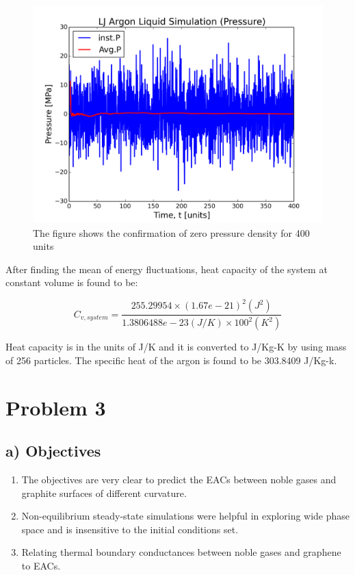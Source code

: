 \documentclass{article}
\begin{document}
\begin{figure}[htb]
\centering
\includegraphics[width=.9\linewidth]{./heat-capacity/LJ-md-Pressure.png}
\caption{\label{fig:P3c}The figure shows the confirmation of zero pressure density for 400 units}
\end{figure}

After finding the mean of energy fluctuations, heat capacity of the system at constant volume is found to be:

\begin{equation}
C_{v,system} = \frac{255.29954 \times (1.67e-21)^{2} (J^2)}{ 1.3806488e-23 (J/K) \times 100^{2} (K^{2}) }
\end{equation}

Heat capacity is in the units of J/K and it is converted to J/Kg-K by using mass of 256 particles. 
The specific heat of the argon is found to be 303.8409 J/Kg-k.

\section{Problem 3}
\label{sec-3}
\subsection{a) Objectives}
\label{sec-3-1}
\begin{enumerate}
\item The objectives are very clear to predict the EACs between noble gases and graphite surfaces of different curvature.
\item Non-equilibrium steady-state simulations were helpful in exploring wide phase space and is insensitive to the initial conditions set.
\item Relating thermal boundary conductances between noble gases and graphene to EACs.
\end{enumerate}
\end{document}
